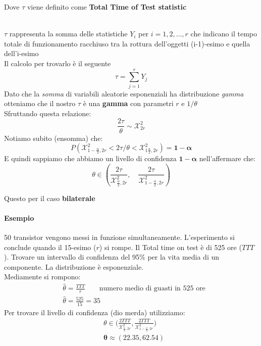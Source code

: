\documentclass[]{article}
\begin{document}
    \centerline{Dove $\tau$ viene definito come \textbf{Total Time of Test statistic}} \\[2ex]
    $\tau$ rappresenta la somma delle statistiche $Y_i$ per $i=1,2,\ldots,r$ che indicano il tempo totale di funzionamento racchiuso tra la rottura dell'oggetti (i-1)-esimo e quella dell'i-esimo \\
    Il calcolo per trovarlo è il seguente 
    \[ \tau = \sum_{j=1}^{r} Y_j \]
    Dato che la \textit{somma} di variabili aleatorie esponenziali ha distribuzione \textit{gamma} otteniamo che il nostro $\tau$ è una \textbf{gamma} con parametri $r$ e $1 / \theta$ \\
    Sfruttando questa relazione:
    \[ \frac{2 \tau}{\theta} \sim \mathcal{X}^2_{2r} \]
    Notiamo subito (ensomma) che:
    \[ P(\mathcal{X}^2_{1-\frac{\alpha}{2}, 2r} < 2 \tau / \theta < \mathcal{X}^2_{1\frac{\alpha}{2}, 2r}) = \boldsymbol{1 -\alpha} \]
    E quindi sappiamo che abbiamo un livello di confidenza $\boldsymbol{1- \alpha}$ nell'affermare che:
    \[ \theta \in \left( \frac{2 \tau}{\mathcal{X}^2_{\frac{\alpha}{2}, 2r}}, \quad \frac{2\tau}{\mathcal{X}^2_{1- \frac{\alpha}{2}, 2r}} \right) \]
    \centerline{Questo per il caso \textbf{bilaterale}}
    \paragraph{Esempio} 50 transistor vengono messi in funzione simultaneamente. L'esperimento si conclude quando il 15-esimo ($r$) si rompe.
    Il Total time on test è di 525 ore ($TTT$). Trovare un intervallo di confidenza del 95\% per la vita media di un componente.
    La distribuzione è esponenziale. \\
    Mediamente si rompono:
    \begin{equation*}
        \begin{split}
            &\hat \theta = \frac{TTT}{r} \qquad \text{numero medio di guasti in 525 ore} \\
            &\hat \theta = \frac{525}{15} = 35
        \end{split}
    \end{equation*}
    Per trovare il livello di confidenza (dio merda) utilizziamo:
    \begin{equation*}
        \begin{split}
            &\theta \in \Big(\frac{2TTT}{\mathcal{X}^2_{\frac{\alpha}{2},2r}},\frac{2TTT}{\mathcal{X}^2_{1-\frac{\alpha}{2},2r}}   \Big) \\[2ex]
            &\boldsymbol{\theta \approx (22.35, 62.54)}
        \end{split}
    \end{equation*}
\end{document}
